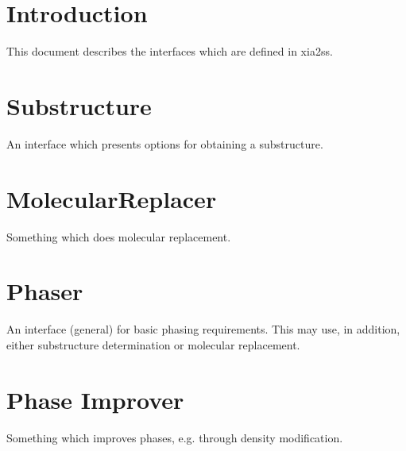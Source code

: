 \documentclass[a4paper, 11pt]{article}
\begin{document}
\section{Introduction}

This document describes the interfaces which are defined in xia2ss.

\section{Substructure}

An interface which presents options for obtaining a substructure.

\section{MolecularReplacer}

Something which does molecular replacement.

\section{Phaser}

An interface (general) for basic phasing requirements. This may use, in 
addition, either substructure determination or molecular replacement.

\section{Phase Improver}

Something which improves phases, e.g. through density modification.
\end{document}
